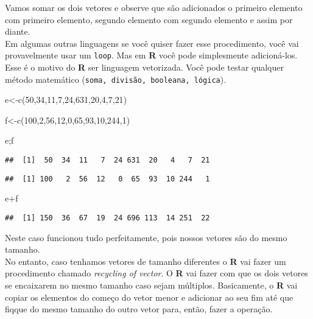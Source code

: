 \documentclass[
]{book}
\newenvironment{Shaded}{\begin{snugshade}}{\end{snugshade}}
\newcommand{\DecValTok}[1]{\textcolor[rgb]{0.00,0.00,0.81}{#1}}
\newcommand{\FunctionTok}[1]{\textcolor[rgb]{0.00,0.00,0.00}{#1}}
\newcommand{\NormalTok}[1]{#1}
\newcommand{\OtherTok}[1]{\textcolor[rgb]{0.56,0.35,0.01}{#1}}
\newcommand{\SpecialCharTok}[1]{\textcolor[rgb]{0.00,0.00,0.00}{#1}}
\begin{document}
Vamos somar os dois vetores e observe que são adicionados o primeiro elemento com primeiro elemento, segundo elemento com segundo elemento e assim por diante.\\
Em algumas outras linguagens se você quiser fazer esse procedimento, você vai provavelmente usar um \texttt{loop}. Mas em \textbf{R} você pode simplesmente adicioná-los. Esse é o motivo do \textbf{R} ser linguagem vetorizada. Você pode testar qualquer método matemático (\texttt{soma,\ divisão,\ booleana,\ lógica}).

\begin{Shaded}
\begin{Highlighting}[]
\NormalTok{e}\OtherTok{\textless{}{-}}\FunctionTok{c}\NormalTok{(}\DecValTok{50}\NormalTok{,}\DecValTok{34}\NormalTok{,}\DecValTok{11}\NormalTok{,}\DecValTok{7}\NormalTok{,}\DecValTok{24}\NormalTok{,}\DecValTok{631}\NormalTok{,}\DecValTok{20}\NormalTok{,}\DecValTok{4}\NormalTok{,}\DecValTok{7}\NormalTok{,}\DecValTok{21}\NormalTok{)}

\NormalTok{f}\OtherTok{\textless{}{-}}\FunctionTok{c}\NormalTok{(}\DecValTok{100}\NormalTok{,}\DecValTok{2}\NormalTok{,}\DecValTok{56}\NormalTok{,}\DecValTok{12}\NormalTok{,}\DecValTok{0}\NormalTok{,}\DecValTok{65}\NormalTok{,}\DecValTok{93}\NormalTok{,}\DecValTok{10}\NormalTok{,}\DecValTok{244}\NormalTok{,}\DecValTok{1}\NormalTok{)}

\NormalTok{e;f}
\end{Highlighting}
\end{Shaded}

\begin{verbatim}
##  [1]  50  34  11   7  24 631  20   4   7  21
\end{verbatim}

\begin{verbatim}
##  [1] 100   2  56  12   0  65  93  10 244   1
\end{verbatim}

\begin{Shaded}
\begin{Highlighting}[]
\NormalTok{e}\SpecialCharTok{+}\NormalTok{f}
\end{Highlighting}
\end{Shaded}

\begin{verbatim}
##  [1] 150  36  67  19  24 696 113  14 251  22
\end{verbatim}

Neste caso funcionou tudo perfeitamente, pois nossos vetores são do mesmo tamanho.\\
No entanto, caso tenhamos vetores de tamanho diferentes o \textbf{R} vai fazer um procedimento chamado \emph{\emph{recycling of vector}}. O \textbf{R} vai fazer com que os dois vetores se encaixarem no mesmo tamanho caso sejam múltiplos. Basicamente, o \textbf{R} vai copiar os elementos do começo do vetor menor e adicionar ao seu fim até que fiqque do mesmo tamanho do outro vetor para, então, fazer a operação.
\end{document}
